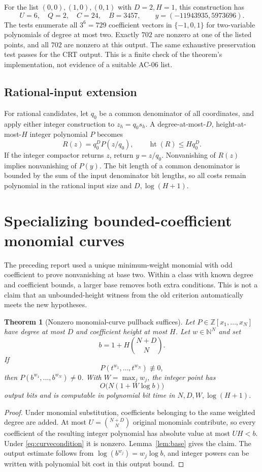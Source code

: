 \documentclass[11pt]{article}
\newtheorem{theorem}{Theorem}[section]
\theoremstyle{definition}
\theoremstyle{remark}
\newcommand{\Z}{\mathbb Z}
\newcommand{\N}{\mathbb N}
\newcommand{\height}{\operatorname{ht}}
\begin{document}
For the list $(0,0),(1,0),(0,1)$ with $D=2,H=1$, this construction has
\[
 U=6,\quad Q=2,\quad C=24,\quad B=3457,
 \qquad y=(-11943935,5973696).
\]
The tests enumerate all $3^6=729$ coefficient vectors in $\{-1,0,1\}$ for two-variable polynomials of degree at most two. Exactly $702$ are nonzero at one of the listed points, and all $702$ are nonzero at this output. The same exhaustive preservation test passes for the CRT output. This is a finite check of the theorem's implementation, not evidence of a suitable AC-06 list.

\subsection{Rational-input extension}

For rational candidates, let $q_0$ be a common denominator of all coordinates, and apply either integer construction to $z_h=q_0s_h$. A degree-at-most-$D$, height-at-most-$H$ integer polynomial $P$ becomes
\[
 R(z)=q_0^D P(z/q_0),
 \qquad \height(R)\le Hq_0^D.
\]
If the integer compactor returns $z$, return $y=z/q_0$. Nonvanishing of $R(z)$ implies nonvanishing of $P(y)$. The bit length of a common denominator is bounded by the sum of the input denominator bit lengths, so all costs remain polynomial in the rational input size and $D,\log(H+1)$.

\section{Specializing bounded-coefficient monomial curves}\label{sec:curves}

The preceding report used a unique minimum-weight monomial with odd coefficient to prove nonvanishing at base two. Within a class with known degree and coefficient bounds, a larger base removes both extra conditions. This is not a claim that an unbounded-height witness from the old criterion automatically meets the new hypotheses.

\begin{theorem}[Nonzero monomial-curve pullback suffices]\label{thm:curve}
Let $P\in\Z[x_1,\ldots,x_N]$ have degree at most $D$ and coefficient height at most $H$. Let $w\in\N^N$ and set
\[
 b=1+H\binom{N+D}{N}.
\]
If
\begin{equation}\label{eq:curvecondition}
 P(t^{w_1},\ldots,t^{w_N})\not\equiv0,
\end{equation}
then $P(b^{w_1},\ldots,b^{w_N})\ne0$. With $W=\max_jw_j$, the integer point has
\[
 O\bigl(N(1+W\log b)\bigr)
\]
output bits and is computable in polynomial bit time in $N,D,W,\log(H+1)$.
\end{theorem}
\begin{proof}
Under monomial substitution, coefficients belonging to the same weighted degree are added. At most $U=\binom{N+D}{N}$ original monomials contribute, so every coefficient of the resulting integer polynomial has absolute value at most $UH<b$. Under \eqref{eq:curvecondition} it is nonzero. Lemma~\ref{lem:base} gives the claim. The output estimate follows from $\log(b^{w_j})=w_j\log b$, and integer powers can be written with polynomial bit cost in this output bound.
\end{proof}
\end{document}
